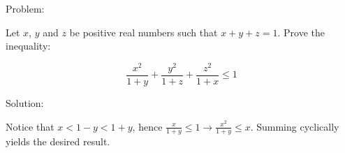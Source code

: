 Problem:

Let $x$, $y$ and $z$ be positive real numbers such that $x+y+z = 1$. Prove the inequality:

$$\frac{x^2}{1+y}+\frac{y^2}{1+z} +\frac{z^2}{1+x} \leq 1$$

Solution:

Notice that $x<1-y<1+y$, hence $\frac{x}{1+y}\le 1\to \frac{x^2}{1+y}\le x$. Summing cyclically yields the desired result.
